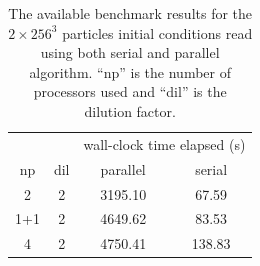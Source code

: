 \documentclass[11pt,a4paper,titlepage]{article}
\newcommand{\virg}[1]{``{#1}''}
\begin{document}
\begin{table}[!h]
\centering
\begin{tabular}{cc|c|c}
    &     & \multicolumn{2}{c}{wall-clock time elapsed (s)} \\
np  & dil & parallel     & serial \\
\hline
2	& 2	  & 3195.10  & 67.59 \\
1+1	& 2	  & 4649.62  & 83.53 \\
4	& 2	  & 4750.41  & 138.83 \\
\end{tabular}
\caption{The available benchmark results for the $2 \times 256^3$ particles initial conditions read using both serial and parallel algorithm. \virg{np} is the number of processors used and \virg{dil} is the dilution factor.}
\label{parallel_vs_serial}
\end{table}
\end{document}
